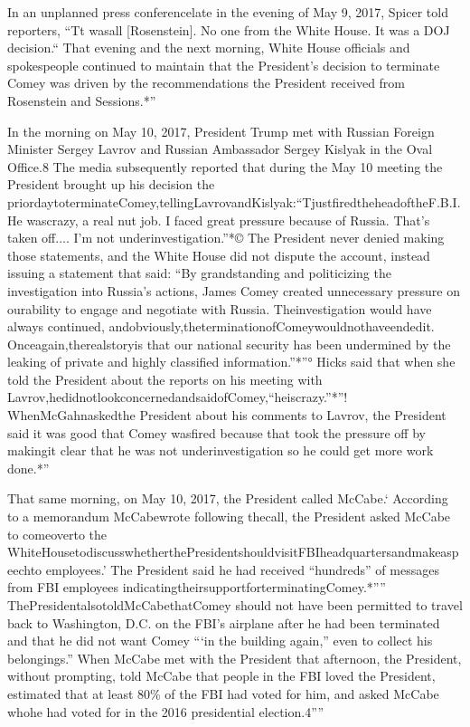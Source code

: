 {In an unplanned press conferencelate in the evening of May 9, 2017, Spicer told reporters, “Tt wasall [Rosenstein].
No one from the White House.
It was a DOJ decision.“
That evening and the next morning, White House officials and spokespeople continued to maintain that the President’s decision to terminate Comey was driven by the recommendations the President received from Rosenstein and Sessions.*”

In the morning on May 10, 2017, President Trump met with Russian Foreign Minister Sergey Lavrov and Russian Ambassador Sergey Kislyak in the Oval Office.8
The media subsequently reported that during the May 10 meeting the President brought up his decision the priordaytoterminateComey,tellingLavrovandKislyak:“TjustfiredtheheadoftheF.B.I.
He wascrazy, a real nut job.
I faced great pressure because of Russia.
That’s taken off....
I’m not underinvestigation.”*©
The President never denied making those statements, and the White House did not dispute the account, instead issuing a statement that said: “By grandstanding and politicizing the investigation into Russia’s actions, James Comey created unnecessary pressure on ourability to engage and negotiate with Russia.
Theinvestigation would have always continued, andobviously,theterminationofComeywouldnothaveendedit.
Onceagain,therealstoryis that our national security has been undermined by the leaking of private and highly classified information.”*”°
Hicks said that when she told the President about the reports on his meeting with Lavrov,hedidnotlookconcernedandsaidofComey,“heiscrazy.”*”!
WhenMcGahnaskedthe President about his comments to Lavrov, the President said it was good that Comey wasfired because that took the pressure off by makingit clear that he was not underinvestigation so he could get more work done.*”

That same morning, on May 10, 2017, the President called McCabe.‘
According to a memorandum McCabewrote following thecall, the President asked McCabe to comeoverto the WhiteHousetodiscusswhetherthePresidentshouldvisitFBIheadquartersandmakeaspeechto employees.’
The President said he had received “hundreds” of messages from FBI employees indicatingtheirsupportforterminatingComey.*””
ThePresidentalsotoldMcCabethatComey should not have been permitted to travel back to Washington, D.C. on the FBI’s airplane after he had been terminated and that he did not want Comey “‘in the building again,” even to collect his belongings.”
When McCabe met with the President that afternoon, the President, without prompting, told McCabe that people in the FBI loved the President, estimated that at least 80\% of the FBI had voted for him, and asked McCabe whohe had voted for in the 2016 presidential election.4””

}
